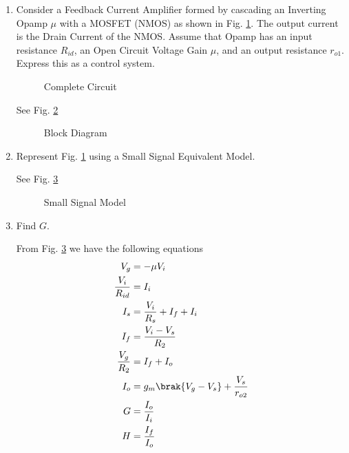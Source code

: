 \begin{enumerate}[label=\thesection.\arabic*.,ref=\thesection.\theenumi]
\item
Consider a Feedback Current Amplifier formed by cascading an Inverting Opamp $\mu$ with a MOSFET (NMOS) as shown in Fig. \ref{fig:ee18btech11021_Complete_Circuit}.
The output current is the Drain Current of the NMOS.
Assume that Opamp has an input resistance $R_{id}$, an Open Circuit Voltage Gain $\mu$, and an output resistance $r_{o1}$.  Express this as a control system.

\renewcommand{\thefigure}{\theenumi.\arabic{figure}}
\begin{figure}[!ht]
	\begin{center}
		\resizebox{\columnwidth}{!}{}
	\end{center}
\caption{Complete Circuit}
\label{fig:ee18btech11021_Complete_Circuit}
\end{figure}
\solution See Fig. \ref{fig:ee18btech11021_Block_Diagram}
%
\begin{figure}[!ht]
	\begin{center}
			\resizebox{\columnwidth}{!}{}
	\end{center}
\caption{Block Diagram}
\label{fig:ee18btech11021_Block_Diagram}
\end{figure}
\renewcommand{\thefigure}{\theenumi}

\item Represent Fig. \ref{fig:ee18btech11021_Complete_Circuit} using a Small Signal Equivalent Model.

\solution See Fig. \ref{fig:ee18btech11021_Small_Signal_Model}

\begin{figure}[!ht]
	\begin{center}
		\resizebox{\columnwidth}{!}{}
	\end{center}
\caption{Small Signal Model}
\label{fig:ee18btech11021_Small_Signal_Model}
\end{figure}

\item Find $G$.

\solution  From Fig. \ref{fig:ee18btech11021_Small_Signal_Model} we have the following equations
\begin{align}
V_g &= -\mu V_i
\\
\frac{V_i}{R_{id}} &= I_i
\\
I_s &= \frac{V_i}{R_s} + I_f + I_i
\\
I_f &= \frac{V_i-V_s}{R_2}
\\
\frac{V_g}{R_2} &= I_f + I_o
\\
I_o &= g_m \brak{V_g-V_s} + \frac{V_s}{r_{o2}}
\\
G &= \frac{I_o}{I_i}
\\
H &= \frac{I_f}{I_o}
\end{align}


\end{enumerate}
